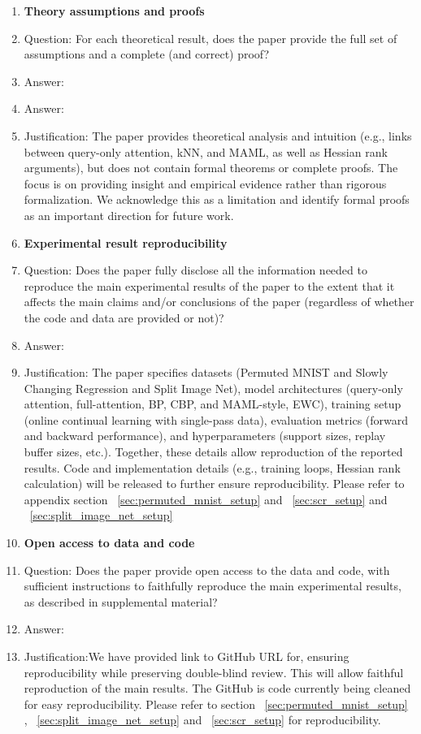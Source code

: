 \begin{enumerate}
\item {\bf Theory assumptions and proofs}
    \item[] Question: For each theoretical result, does the paper provide the full set of assumptions and a complete (and correct) proof?
    \item[] Answer:\item[] Answer: \answerNo{} %
    \item[] Justification: The paper provides theoretical analysis and intuition (e.g., links between query-only attention, kNN, and MAML, as well as Hessian rank arguments), but does not contain formal theorems or complete proofs. The focus is on providing insight and empirical evidence rather than rigorous formalization. We acknowledge this as a limitation and identify formal proofs as an important direction for future work.

    \item {\bf Experimental result reproducibility}
    \item[] Question: Does the paper fully disclose all the information needed to reproduce the main experimental results of the paper to the extent that it affects the main claims and/or conclusions of the paper (regardless of whether the code and data are provided or not)?
    \item[] Answer: \answerYes{} %
    \item[] Justification: The paper specifies datasets (Permuted MNIST and Slowly Changing Regression and Split Image Net), model architectures (query-only attention, full-attention, BP, CBP, and MAML-style, EWC), training setup (online continual learning with single-pass data), evaluation metrics (forward and backward performance), and hyperparameters (support sizes, replay buffer sizes, etc.). Together, these details allow reproduction of the reported results. Code and implementation details (e.g., training loops, Hessian rank calculation) will be released to further ensure reproducibility. Please refer to appendix section ~\ref{sec:permuted_mnist_setup} and ~\ref{sec:scr_setup} and ~\ref{sec:split_image_net_setup}


\item {\bf Open access to data and code}
    \item[] Question: Does the paper provide open access to the data and code, with sufficient instructions to faithfully reproduce the main experimental results, as described in supplemental material?
    \item[] Answer: \answerYes{} %
    \item[] Justification:We have provided link to GitHub URL for, ensuring reproducibility while preserving double-blind review. This will allow faithful reproduction of the main results. The GitHub is code currently being cleaned for easy reproducibility. Please refer to section ~\ref{sec:permuted_mnist_setup} , ~\ref{sec:split_image_net_setup} and ~\ref{sec:scr_setup} for reproducibility.



\end{enumerate}
